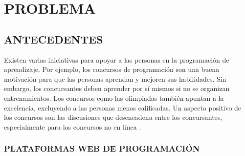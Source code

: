 \section{PROBLEMA}

\subsection{ANTECEDENTES}

Existen varias iniciativas para apoyar a las personas en la programación de aprendizaje. Por ejemplo, los concursos de programación son una buena motivación para que las personas aprendan y mejoren sus habilidades.
Sin embargo, los concursantes deben aprender por sí mismos si no se organizan entrenamientos. Los concursos como las olimpiadas también apuntan a la excelencia, excluyendo a las personas menos calificadas. Un aspecto positivo de los concursos son las discusiones que desencadena entre los concursantes, especialmente para los concursos no en línea \citep{Combéfis-Saint_Marcq}.

\subsubsection{PLATAFORMAS WEB DE PROGRAMACIÓN}


